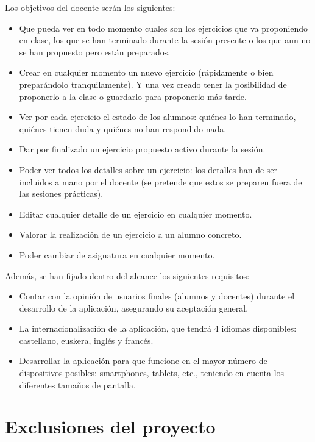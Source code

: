 Los objetivos del docente serán los siguientes:

\begin{itemize}
\item Que pueda ver en todo momento cuales son los ejercicios que va proponiendo en clase, los que se han terminado durante la sesión presente o los que aun no se han propuesto pero están preparados.
\item Crear en cualquier momento un nuevo ejercicio (rápidamente o bien preparándolo tranquilamente). Y una vez creado tener la posibilidad de proponerlo a la clase o guardarlo para proponerlo más tarde.
\item Ver por cada ejercicio el estado de los alumnos: quiénes lo han terminado, quiénes tienen duda y quiénes no han respondido nada.
\item Dar por finalizado un ejercicio propuesto activo durante la sesión.
\item Poder ver todos los detalles sobre un ejercicio: los detalles han de ser incluidos a mano por el docente (se pretende que estos se preparen fuera de las sesiones prácticas).
\item Editar cualquier detalle de un ejercicio en cualquier momento.
\item Valorar la realización de un ejercicio a un alumno concreto.
\item Poder cambiar de asignatura en cualquier momento.

\end{itemize}

Además, se han fijado dentro del alcance los siguientes requisitos:

\begin{itemize}
\item Contar con la opinión de usuarios finales (alumnos y docentes) durante el desarrollo de la aplicación, asegurando su aceptación general.
\item La internacionalización de la aplicación, que tendrá 4 idiomas disponibles: castellano, euskera, inglés y francés.
\item Desarrollar la aplicación para que funcione en el mayor número de dispositivos posibles: smartphones, tablets, etc., teniendo en cuenta los diferentes tamaños de pantalla.
\end{itemize}

\section{Exclusiones del proyecto}

